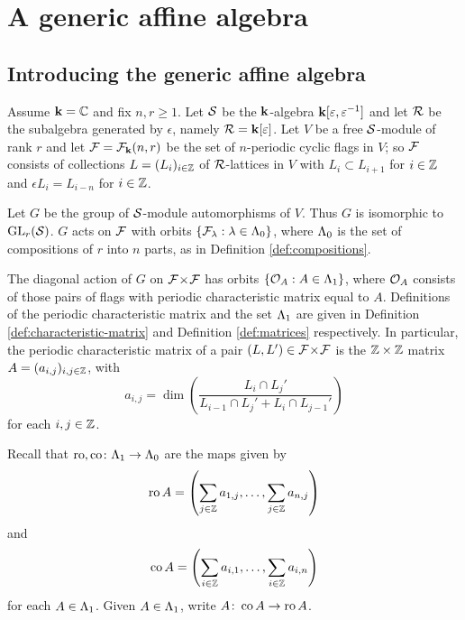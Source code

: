 \documentclass[a4paper, 11pt]{report}
\begin{document}
\chapter{A generic affine algebra}

\section{Introducing the generic affine algebra}

Assume $\mathbf{k} = \mathbb{C}$ and fix $n,r\geq 1$. Let $\mathcal{S}$ be the $\mathbf{k}$-algebra $\mathbf{k}[\varepsilon,\varepsilon^{-1}]$ and let $\mathcal{R}$ be the subalgebra generated by $\epsilon$, namely $\mathcal{R}=\mathbf{k}[\varepsilon]$. Let $V$ be a free $\mathcal{S}$-module of rank $r$ and let $\mathcal{F} = \mathcal{F}_{\mathbf{k}}(n,r)$ be the set of $n$-periodic cyclic flags in $V$; so $\mathcal{F}$ consists of collections $L = (L_i)_{i\in\mathbb{Z}}$ of $\mathcal{R}$-lattices in $V$ with $L_i\subset L_{i+1}$ for $i\in\mathbb{Z}$ and $\epsilon L_i = L_{i-n}$ for $i\in\mathbb{Z}$.

Let $G$ be the group of $\mathcal{S}$-module automorphisms of $V$. Thus $G$ is isomorphic to $\operatorname{GL}_{r}(\mathcal{S})$. $G$ acts on $\mathcal{F}$ with orbits $\{\mathcal{F}_\lambda:\lambda\in{\Lambda_0}\}$, where ${\Lambda_0}$ is the set of compositions of $r$ into $n$ parts, as in Definition \ref{def:compositions}.

The diagonal action of $G$ on ${\mathcal{F}\!\times\!\mathcal{F}}$ has orbits $\{\mathcal{O}_{A}:A\in{\Lambda_1}\}$, where $\mathcal{O}_{A}$ consists of those pairs of flags with periodic characteristic matrix equal to $A$. Definitions of the periodic characteristic matrix and the set ${\Lambda_1}$ are given in Definition \ref{def:characteristic-matrix} and Definition \ref{def:matrices} respectively. In particular, the periodic characteristic matrix of a pair $(L,L')\in{\mathcal{F}\!\times\!\mathcal{F}}$ is the $\mathbb{Z}\times\mathbb{Z}$ matrix $A = (a_{i,j})_{i,j\in\mathbb{Z}}$, with
\begin{equation*}
a_{i,j} = \dim\left(\frac{L_i\cap L_j'}{L_{i-1}\cap L_j' + L_i\cap L_{j-1}'}\right)
\end{equation*}
for each $i,j\in\mathbb{Z}$.

Recall that $\operatorname{ro},\operatorname{co}\colon{\Lambda_1}\to{\Lambda_0}$ are the maps given by
\begin{equation*}
\operatorname{ro}{A} = \left(\sum_{j\in\mathbb{Z}} a_{1,j},\ldots, \sum_{j\in\mathbb{Z}}a_{n,j}\right)
\end{equation*}
and
\begin{equation*}
\operatorname{co}{A} = \left(\sum_{i\in\mathbb{Z}} a_{i,1},\ldots, \sum_{i\in\mathbb{Z}} a_{i,n}\right)
\end{equation*}
for each $A\in{\Lambda_1}$. Given $A\in{\Lambda_1}$, write $A\colon\operatorname{co}{A}\to\operatorname{ro}{A}$.
\end{document}
